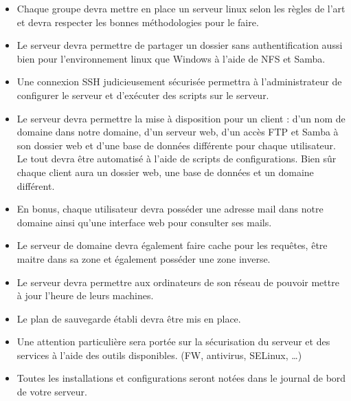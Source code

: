\documentclass{article}
\begin{document}
\begin{itemize}
\item Chaque groupe devra mettre en place un serveur linux selon les règles de l’art et devra respecter les bonnes méthodologies pour le faire.
\item Le serveur devra permettre de partager un dossier sans authentification aussi bien pour l’environnement linux que Windows à l’aide de NFS et Samba.
\item Une connexion SSH judicieusement sécurisée permettra à l’administrateur de configurer le serveur et d’exécuter des scripts sur le serveur.
\item Le serveur devra permettre la mise à disposition pour un client : d’un nom de domaine dans notre domaine, d’un serveur web, d’un accès FTP et Samba à son dossier web et d’une base de données différente pour chaque utilisateur. Le tout devra être automatisé à l’aide de scripts de configurations. Bien sûr chaque client aura un dossier web, une base de données et un domaine différent.
\item En bonus, chaque utilisateur devra posséder une adresse mail dans notre domaine ainsi qu’une interface web pour consulter ses mails.
\item Le serveur de domaine devra également faire cache pour les requêtes, être maitre dans sa zone et également posséder une zone inverse.
\item Le serveur devra permettre aux ordinateurs de son réseau de pouvoir mettre à jour l’heure de leurs machines.
\item Le plan de sauvegarde établi devra être mis en place.
\item Une attention particulière sera portée sur la sécurisation du serveur et des services à l’aide des outils disponibles. (FW, antivirus, SELinux, …)
\item Toutes les installations et configurations seront notées dans le journal de bord de votre serveur.
		
\end{itemize}
	
\newpage	
	
\end{document}
